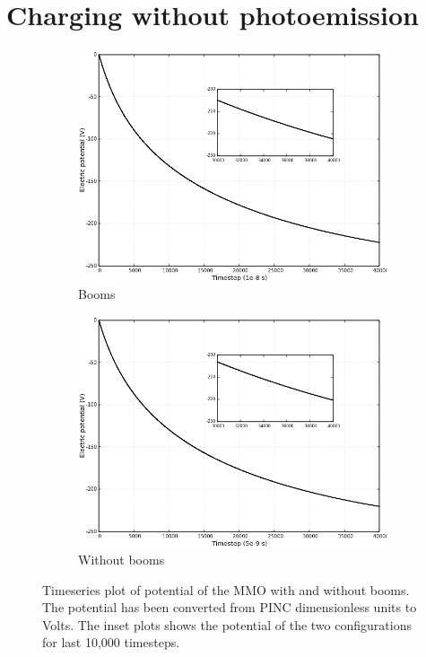 \section{Charging without photoemission}\label{subsec:noPHsec}
\begin{center}
    \begin{figure}[H]
      \begin{subfigure}[b]{0.75\textwidth}
      \includegraphics[width=\columnwidth]{figures/MMO/noPH/WB/C_noPH_WB.png}
      \caption{Booms}
      \label{fig:C_noPH_WB}
    \end{subfigure}
    \par\bigskip
    \begin{subfigure}[b]{0.75\textwidth}
      \includegraphics[width=\columnwidth]{figures/MMO/noPH/NB/C_noPH_NB.png}
      \caption{Without booms}
      \label{fig:C_noPH_NB}
    \end{subfigure}
  \caption{Timeseries plot of potential of the MMO with and without booms. The potential has been converted from PINC dimensionless units to Volts. The inset plots shows the potential of the two configurations for last 10,000 timesteps.}
    \label{fig:ConvnoPH}
  \end{figure}
\end{center}

